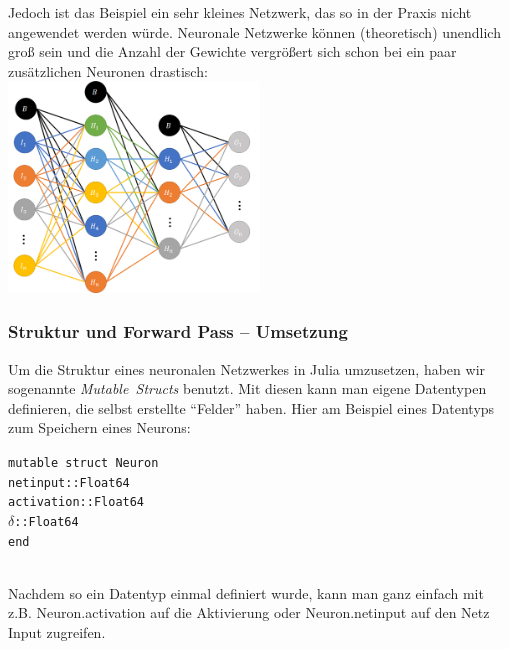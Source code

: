 \documentclass[11pt, a4paper, ngerman]{article}
\begin{document}
		Jedoch ist das Beispiel ein sehr kleines Netzwerk, das so in der Praxis nicht angewendet werden würde. Neuronale Netzwerke können (theoretisch) unendlich groß sein und die Anzahl der Gewichte vergrößert sich schon bei ein paar zusätzlichen Neuronen drastisch:\\
		
		\begingroup
		\centering
		\noindent \includegraphics[width=0.5\textwidth]{pictures/bsp_net_big.png}
		\endgroup

		\subsubsection{Struktur und Forward Pass -- Umsetzung} \label{Struktur und Forward Pass - Umsetzung}
		Um die Struktur eines neuronalen Netzwerkes in Julia umzusetzen, haben wir sogenannte \mbox{\textit{Mutable Structs}} benutzt. Mit diesen kann man eigene Datentypen definieren, die selbst erstellte \enquote{Felder} haben. Hier am Beispiel eines Datentyps zum Speichern eines Neurons:\\[1.5ex]
		\begin{minipage}{\textwidth}
			\texttt{mutable struct Neuron\\
			\hspace*{4ex}netinput::Float64\\
			\hspace*{4ex}activation::Float64\\
			\hspace*{4ex}$\delta$::Float64\\
			end}
		\end{minipage}\\[1.5ex]
		Nachdem so ein Datentyp einmal definiert wurde, kann man ganz einfach mit z.B. \mbox{Neuron.activation} auf die Aktivierung oder \mbox{Neuron.netinput} auf den Netz Input zugreifen.
		
\end{document}
